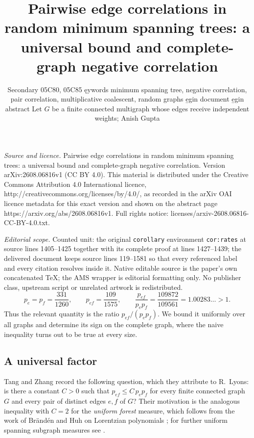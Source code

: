 \documentclass[10pt,a4paper]{amsart}
\begin{document}
\title[Pairwise edge correlations in random minimum spanning trees:]{Pairwise edge correlations in random minimum spanning trees: a universal bound and complete-graph negative correlation}
\author{Secondary 05C80, 05C85 ęywords minimum spanning tree, negative correlation, pair correlation, multiplicative coalescent, random graphs e̱gin document e̱gin abstract Let $G$ be a finite connected multigraph whose edges receive independent weights; Anish Gupta}
\date{}
\maketitle
\noindent\emph{Source and licence.} Pairwise edge correlations in random minimum spanning trees: a universal bound and complete-graph negative correlation. Version arXiv:2608.06816v1 (CC BY 4.0). This material is distributed under the Creative Commons Attribution 4.0 International licence, http://creativecommons.org/licenses/by/4.0/, as recorded in the arXiv OAI licence metadata for this exact version and shown on the abstract page https://arxiv.org/abs/2608.06816v1. Full rights notice: licenses/arxiv-2608.06816-CC-BY-4.0.txt.\par\smallskip
\noindent\textit{Editorial scope.} Counted unit: the original \texttt{corollary} environment \texttt{cor:rates} at source lines 1405--1425 together with its complete proof at lines 1427--1439; the delivered document keeps source lines 119--1581 so that every referenced label and every citation resolves inside it. Native editable source is the paper's own concatenated TeX; the AMS wrapper is editorial formatting only. No publisher class, upstream script or unrelated artwork is redistributed.
\begin{equation}
\label{eq:lps}
p_e=p_f=\frac{331}{1260},\qquad p_{ef}=\frac{109}{1575},\qquad
\frac{p_{ef}}{p_ep_f}=\frac{109872}{109561}=1.00283\ldots>1 .
\end{equation}
Thus the relevant quantity is the ratio $p_{ef}/(p_ep_f)$. We bound it uniformly
over all graphs and determine its sign on the complete graph, where the naive
inequality turns out to be true at every size.

\subsection{A universal factor}
\label{ssec:introA}

Tang and Zhang \cite[Question 3.13]{TZ} record the following question, which they
attribute to R.~Lyons: is there a constant $C>0$ such that
$p_{ef}\le C\,p_ep_f$ for every finite connected graph $G$ and every pair of
distinct edges $e,f$ of $G$? Their motivation is the analogous inequality with
$C=2$ for the \emph{uniform forest} measure, which follows from the work of
Br\"and\'en and Huh on Lorentzian polynomials \cite{BH}; for further uniform
spanning subgraph measures see \cite{TZ2}.
\end{document}
